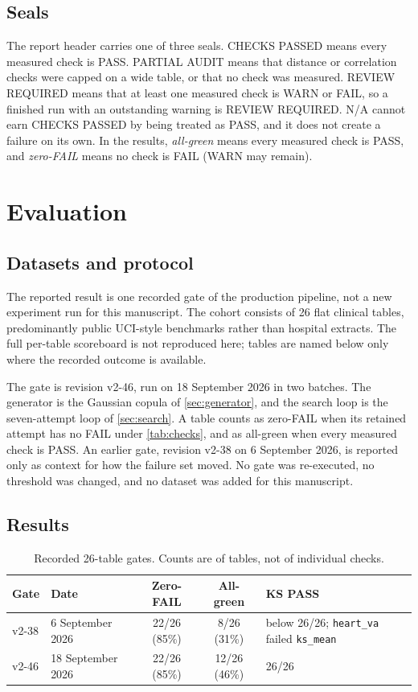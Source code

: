 \documentclass[11pt,a4paper]{article}
\begin{document}
\subsection{Seals}\label{sec:seals}

The report header carries one of three seals. CHECKS PASSED means every measured check is PASS. PARTIAL AUDIT means that distance or correlation checks were capped on a wide table, or that no check was measured. REVIEW REQUIRED means that at least one measured check is WARN or FAIL, so a finished run with an outstanding warning is REVIEW REQUIRED. N/A cannot earn CHECKS PASSED by being treated as PASS, and it does not create a failure on its own. In the results, \emph{all-green} means every measured check is PASS, and \emph{zero-FAIL} means no check is FAIL (WARN may remain).

\section{Evaluation}\label{sec:eval}

\subsection{Datasets and protocol}

The reported result is one recorded gate of the production pipeline, not a new experiment run for this manuscript. The cohort consists of 26 flat clinical tables, predominantly public UCI-style benchmarks rather than hospital extracts. The full per-table scoreboard is not reproduced here; tables are named below only where the recorded outcome is available.

The gate is revision v2-46, run on 18 September 2026 in two batches. The generator is the Gaussian copula of \cref{sec:generator}, and the search loop is the seven-attempt loop of \cref{sec:search}. A table counts as zero-FAIL when its retained attempt has no FAIL under \cref{tab:checks}, and as all-green when every measured check is PASS. An earlier gate, revision v2-38 on 6 September 2026, is reported only as context for how the failure set moved. No gate was re-executed, no threshold was changed, and no dataset was added for this manuscript.

\subsection{Results}\label{sec:results}

\begin{table}[t]
\centering
\small
\caption{Recorded 26-table gates. Counts are of tables, not of individual checks.}
\label{tab:gates}
\begin{tabularx}{\textwidth}{@{}l l c c L@{}}
\toprule
Gate & Date & Zero-FAIL & All-green & KS PASS \\
\midrule
v2-38 & 6 September 2026 & 22/26 (85\%) & 8/26 (31\%) & below 26/26; \texttt{heart\_va} failed \texttt{ks\_mean} \\
v2-46 & 18 September 2026 & 22/26 (85\%) & 12/26 (46\%) & 26/26 \\
\bottomrule
\end{tabularx}
\end{table}
\end{document}
